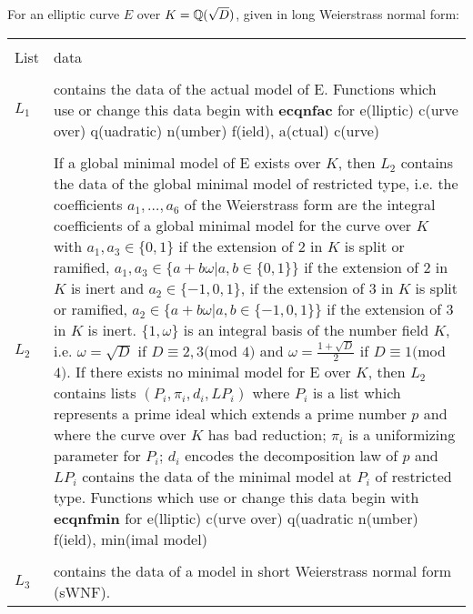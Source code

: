 \newline
For an elliptic curve $E$ over $K=\mbox{$\mathbb Q$}(\sqrt{D})$, given in long Weierstrass normal form:
\begin{center}
      \begin{tabular}{|p{0.3in}|p{5.2in}|} 
\hline & \\[-1.3ex]
List & data \\[1.5ex]
\hline &\\[-1.3ex]
$L_1$ & contains the data of the actual model of E. Functions which 
         use or change this data begin with {\bf ecqnfac} for \newline
         e(lliptic) c(urve over) q(uadratic) n(umber) f(ield), a(ctual) c(urve)\\[1.5ex]
\hline & \\[-1.3ex]
$L_2$ & If a global minimal model of E exists over $K$, then 
         $L_2$ contains the data of the global minimal model of restricted
         type, i.e. the coefficients $a_1,\ldots, a_6$ of the Weierstrass form 
         are the integral coefficients of a global minimal model for the curve 
         over $K$ with $a_1, a_3 \in \{0, 1\}$ if the extension of $2$ in $K$ 
         is split or ramified, $a_1, a_3 \in \{a+b\omega| a,b\in \{0,1\}\}$ if
         the extension of $2$ in $K$ is inert and $a_2 \in \{-1, 0, 1\}$, if the
         extension of $3$ in $K$ is split or ramified, 
         $a_2 \in \{a+b\omega | a,b\in \{-1,0,1\}\}$ if the extension of $3$ in
         $K$ is inert. $\{1, \omega\}$ is an integral basis of the number field
         $K$, i.e. $\omega = \sqrt{D}$ if $D\equiv 2,3 ($mod $4)$ and 
         $\omega = \frac{1+\sqrt{D}}{2}$ if $D\equiv 1 ($mod $4)$. \newline
         If there exists no minimal model for E over $K$, then $L_2$
         contains lists $(P_i, \pi_i, d_i, LP_i)$ where $P_i$ is a list
         which represents a prime ideal which extends a prime number $p$ and 
         where the curve over $K$ has bad reduction; $\pi_i$ is a uniformizing
         parameter for $P_i$; $d_i$ encodes the decomposition law of $p$ and
         $LP_i$ contains the data of the minimal model at $P_i$ of restricted 
         type. \newline
         Functions which use or change this data begin with {\bf ecqnfmin} for \newline
         e(lliptic) c(urve over) q(uadratic n(umber) f(ield), min(imal model) \\[1.5ex]
\hline & \\[-1.3ex]
$L_3$ & contains the data of a model in short Weierstrass normal form (sWNF).

\end{tabular}
\end{center}
